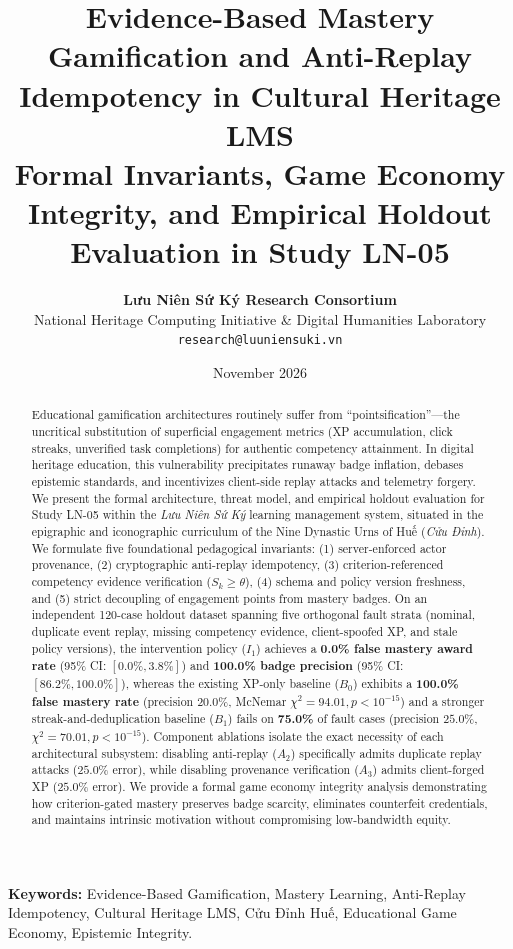 \documentclass[11pt,a4paper]{article}
\title{\textbf{Evidence-Based Mastery Gamification and Anti-Replay Idempotency in Cultural Heritage LMS}\\[0.5em]
\large Formal Invariants, Game Economy Integrity, and Empirical Holdout Evaluation in Study LN-05}
\author{\textbf{Lưu Niên Sứ Ký Research Consortium}\\
National Heritage Computing Initiative \& Digital Humanities Laboratory\\
\texttt{research@luuniensuki.vn}}
\date{November 2026}
\begin{document}
\maketitle

\begin{abstract}
Educational gamification architectures routinely suffer from ``pointsification''—the uncritical substitution of superficial engagement metrics (XP accumulation, click streaks, unverified task completions) for authentic competency attainment. In digital heritage education, this vulnerability precipitates runaway badge inflation, debases epistemic standards, and incentivizes client-side replay attacks and telemetry forgery. We present the formal architecture, threat model, and empirical holdout evaluation for Study LN-05 within the \textit{Lưu Niên Sứ Ký} learning management system, situated in the epigraphic and iconographic curriculum of the Nine Dynastic Urns of Huế (\textit{Cửu Đỉnh}). We formulate five foundational pedagogical invariants: (1) server-enforced actor provenance, (2) cryptographic anti-replay idempotency, (3) criterion-referenced competency evidence verification ($S_k \ge \theta$), (4) schema and policy version freshness, and (5) strict decoupling of engagement points from mastery badges. On an independent 120-case holdout dataset spanning five orthogonal fault strata (nominal, duplicate event replay, missing competency evidence, client-spoofed XP, and stale policy versions), the intervention policy ($I_1$) achieves a \textbf{0.0\% false mastery award rate} (95\% CI: $[0.0\%, 3.8\%]$) and \textbf{100.0\% badge precision} (95\% CI: $[86.2\%, 100.0\%]$), whereas the existing XP-only baseline ($B_0$) exhibits a \textbf{100.0\% false mastery rate} (precision $20.0\%$, McNemar $\chi^2 = 94.01, p < 10^{-15}$) and a stronger streak-and-deduplication baseline ($B_1$) fails on \textbf{75.0\%} of fault cases (precision $25.0\%$, $\chi^2 = 70.01, p < 10^{-15}$). Component ablations isolate the exact necessity of each architectural subsystem: disabling anti-replay ($A_2$) specifically admits duplicate replay attacks ($25.0\%$ error), while disabling provenance verification ($A_3$) admits client-forged XP ($25.0\%$ error). We provide a formal game economy integrity analysis demonstrating how criterion-gated mastery preserves badge scarcity, eliminates counterfeit credentials, and maintains intrinsic motivation without compromising low-bandwidth equity.
\end{abstract}

\noindent\textbf{Keywords:} Evidence-Based Gamification, Mastery Learning, Anti-Replay Idempotency, Cultural Heritage LMS, Cửu Đỉnh Huế, Educational Game Economy, Epistemic Integrity.
\end{document}
